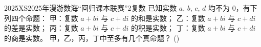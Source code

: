 
\begin{problem}{2025}{XS}{2025年漫游数海“回归课本联赛”}{2}{复数}
已知实数 $ a $, $ b $, $ c $, $ d $ 均不为 $ 0 $，有下列四个命题：  
甲：复数 $ a+bi $ 与 $ c+di $ 的和是实数；  
乙：复数 $ a+bi $ 与 $ c+di $ 的差是实数；  
丙：复数 $ a+bi $ 与 $ c+di $ 的积是实数；  
丁：复数 $ a+bi $ 与 $ c+di $ 的商是实数。  
甲，乙，丙，丁中至多有几个真命题？ (\hspace{1cm})
\begin{choices}
\end{choices}
\end{problem}

\begin{answer}

\end{answer}

\begin{solutions}

\end{solutions}